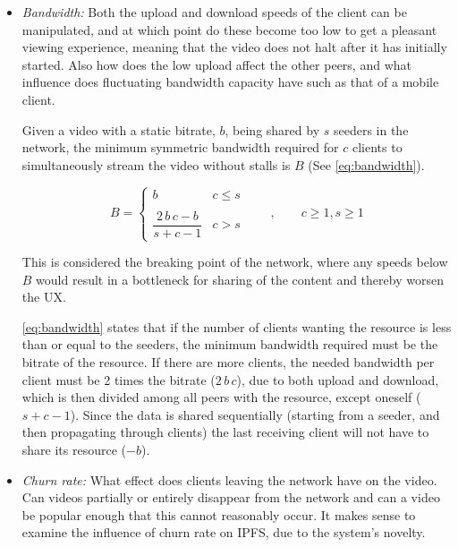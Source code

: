 \begin{itemize}
    \item \textit{Bandwidth:}
    Both the upload and download speeds of the client can be manipulated, and at which point do these become too low to get a pleasant viewing experience, meaning that the video does not halt after it has initially started. Also how does the low upload affect the other peers, and what influence does fluctuating bandwidth capacity have such as that of a mobile client.
    
    Given a video with a static bitrate, $b$, being shared by $s$ seeders in the network, the minimum symmetric bandwidth required for $c$ clients to simultaneously stream the video without stalls is $B$ (See \autoref{eq:bandwidth}).
    
    \begin{equation} \label{eq:bandwidth}
        B = 
        \begin{cases}
            b   &   c \leq s
        \\ \\
            \dfrac{2 \, b \, c - b}{s + c - 1}  &  c > s
        \end{cases}
        \qquad , \qquad 
        c \geq 1 ,
        s \geq 1 
    \end{equation}
    
    This is considered the breaking point of the network, where any speeds below $B$ would result in a bottleneck for sharing of the content and thereby worsen the \ac{UX}.
    
    \autoref{eq:bandwidth} states that if the number of clients wanting the resource is less than or equal to the seeders, the minimum bandwidth required must be the bitrate of the resource. 
    If there are more clients, the needed bandwidth per client must be 2 times the bitrate ($2 \, b \, c$), due to both upload and download, which is then divided among all peers with the resource, except oneself ($s+c-1$).
    Since the data is shared sequentially (starting from a seeder, and then propagating through clients) the last receiving client will not have to share its resource ($-b$). 
    
    \item \textit{Churn rate:}
    What effect does clients leaving the network have on the video. Can videos partially or entirely disappear from the network and can a video be popular enough that this cannot reasonably occur. It makes sense to examine the influence of churn rate on \ac{IPFS}, due to the system's novelty.
   

\end{itemize}
